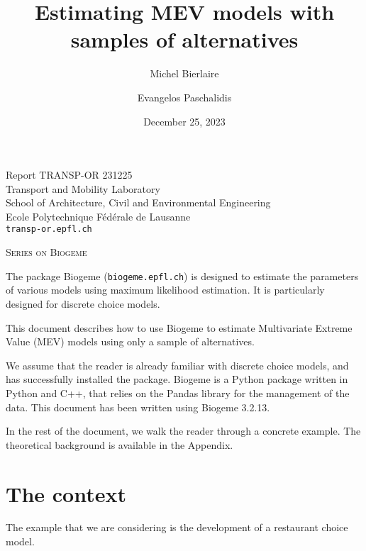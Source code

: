\documentclass[12pt,a4paper]{article}
\title{Estimating MEV models with samples of alternatives}
\author{Michel Bierlaire \and Evangelos Paschalidis}
\date{December 25, 2023}
\begin{document}
\begin{titlepage}
  \pagestyle{empty}

  \maketitle
  \vspace{2cm}

  \begin{center}
    \small Report TRANSP-OR 231225 \\ Transport and Mobility Laboratory \\ School of Architecture, Civil and Environmental Engineering \\ Ecole Polytechnique F\'ed\'erale de Lausanne \\ \verb+transp-or.epfl.ch+
    \begin{center}
      \textsc{Series on Biogeme}
    \end{center}
  \end{center}


  \clearpage
\end{titlepage}


The package Biogeme (\texttt{biogeme.epfl.ch}) is designed to estimate
the parameters of various models using maximum likelihood
estimation. It is particularly designed for discrete choice
models.

This document describes how to use Biogeme to estimate
Multivariate Extreme Value (MEV) models using only a sample of
alternatives. 

We assume that the reader is already familiar with discrete choice
models, and has successfully installed the package.  Biogeme is
a Python package written in Python and C++, that relies on the
Pandas library for the management of the data.  This document has
been written using Biogeme 3.2.13.

In the rest of the document, we walk the reader through a concrete
example. The theoretical background is available in the Appendix.

\section{The context}
\label{eq:context}

The example that we are considering is the development of a restaurant choice model.
\end{document}
